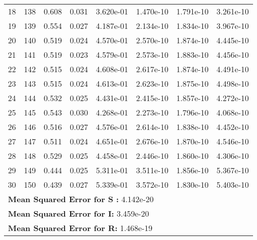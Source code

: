 \begin{table}[ht]
\begin{tabular}{rccccccc}
     18 & 138 &        0.608 &     0.031 & 3.620e-01 & 1.470e-10 & 1.791e-10 &  3.261e-10 \\ 
     19 & 139 &        0.554 &     0.027 & 4.187e-01 & 2.134e-10 & 1.834e-10 &  3.967e-10 \\ 
     20 & 140 &        0.519 &     0.024 & 4.570e-01 & 2.570e-10 & 1.874e-10 &  4.445e-10 \\ 
     21 & 141 &        0.519 &     0.023 & 4.579e-01 & 2.573e-10 & 1.883e-10 &  4.456e-10 \\ 
     22 & 142 &        0.515 &     0.024 & 4.608e-01 & 2.617e-10 & 1.874e-10 &  4.491e-10 \\ 
     23 & 143 &        0.515 &     0.024 & 4.613e-01 & 2.623e-10 & 1.875e-10 &  4.498e-10 \\ 
     24 & 144 &        0.532 &     0.025 & 4.431e-01 & 2.415e-10 & 1.857e-10 &  4.272e-10 \\ 
     25 & 145 &        0.543 &     0.030 & 4.268e-01 & 2.273e-10 & 1.796e-10 &  4.068e-10 \\ 
     26 & 146 &        0.516 &     0.027 & 4.576e-01 & 2.614e-10 & 1.838e-10 &  4.452e-10 \\ 
     27 & 147 &        0.511 &     0.024 & 4.651e-01 & 2.676e-10 & 1.870e-10 &  4.546e-10 \\ 
     28 & 148 &        0.529 &     0.025 & 4.458e-01 & 2.446e-10 & 1.860e-10 &  4.306e-10 \\ 
     29 & 149 &        0.444 &     0.025 & 5.311e-01 & 3.511e-10 & 1.856e-10 &  5.367e-10 \\ 
     30 & 150 &        0.439 &     0.027 & 5.339e-01 & 3.572e-10 & 1.830e-10 &  5.403e-10 \\ 
    \hline
     \multicolumn{6}{l}{\textbf{Mean Squared Error for S :} 4.142e-20}\\ 
     \multicolumn{6}{l}{\textbf{Mean Squared Error for I:} 3.459e-20}\\ 
     \multicolumn{6}{l}{\textbf{Mean Squared Error for R:} 1.468e-19}\\ 
  \end{tabular}
  \label{tbl:ELM tuned by PSO_test}
\end{table}
